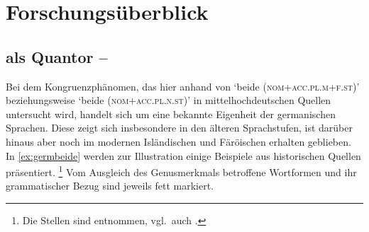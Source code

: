 \chapter{Forschungsüberblick}
\label{ch:forschungsueberblick}

\section%
	{ als Quantor -- }
\label{sec:ovwbeidequant}

Bei dem Kongruenzphänomen, das hier anhand von 
`beide (\textsc{nom+acc.pl.m+f.st})' beziehungsweise 
`beide (\textsc{nom+acc.pl.n.st})' in mittelhochdeutschen Quellen
untersucht wird, handelt sich um eine bekannte Eigenheit der germanischen
Sprachen. Diese zeigt sich insbesondere in den älteren Sprachstufen, ist
darüber hinaus aber noch im modernen Isländischen
\autocites[283]{corbett1991}[569]{wechsler2009} und Färöischen
\autocite[225--226]{thrainsson2004} erhalten geblieben. In \cref{ex:germbeide}
werden zur Illustration einige Beispiele aus historischen Quellen präsentiert.%
%
	\footnote{Die Stellen sind \citet[12]{askedal1973} entnommen, vgl.~auch
		\citet{hock2008,hock2009}.}
%
Vom Ausgleich des Genusmerkmals betroffene Wortformen und ihr grammatischer
Bezug sind jeweils fett markiert.

